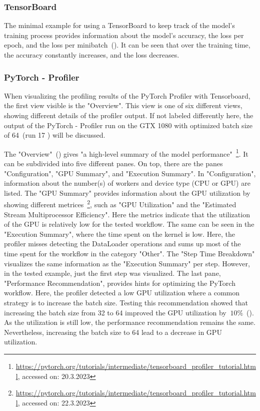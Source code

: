 \documentclass[12pt, a4paper, hidelinks]{article}
\begin{document}
\subsubsection{TensorBoard}
\label{sec:r-tensorboard}

The minimal example for using a TensorBoard to keep track of the model's training process provides information about the model's accuracy, the loss per epoch, and the loss per minibatch~(). It can be seen that over the training time, the accuracy constantly increases, and the loss decreases.

\subsubsection{PyTorch - Profiler}
\label{sec:r-pytorch-profiler}

When visualizing the profiling results of the PyTorch Profiler with Tensorboard, the first view visible is the "Overview". This view is one of six different views, showing different details of the profiler output. If not labeled differently here, the output of the PyTorch - Profiler run on the GTX 1080 with optimized batch size of 64~(run 17 ) will be discussed.

The "Overview"~() gives "a high-level summary of the model performance"~\footnote{\url{https://pytorch.org/tutorials/intermediate/tensorboard_profiler_tutorial.html}, accessed on: 20.3.2023}. It can be subdivided into five different panes. On top, there are the panes "Configuration", "GPU Summary", and "Execution Summary". In "Configuration", information about the number(s) of workers and device type (\ac{CPU} or \ac{GPU}) are listed. The "GPU Summary" provides information about the GPU utilization by showing different metrices~\footnote{\url{https://pytorch.org/tutorials/intermediate/tensorboard_profiler_tutorial.html}, accessed on: 22.3.2023}, such as "GPU Utilization" and the "Estimated Stream Multiprocessor Efficiency". Here the metrics indicate that the utilization of the GPU is relatively low for the tested workflow. The same can be seen in the "Execution Summary", where the time spent on the kernel is low. Here, the profiler misses detecting the DataLoader operations and sums up most of the time spent for the workflow in the category "Other". The "Step Time Breakdown" visualizes the same information as the "Execution Summary" per step. However, in the tested example, just the first step was visualized. The last pane, "Performance Recommendation", provides hints for optimizing the PyTorch workflow. Here, the profiler detected a low \ac{GPU} utilization where a common strategy is to increase the batch size. Testing this recommendation showed that increasing the batch size from 32 to 64 improved the GPU utilization by $~10\%$~(). As the utilization is still low, the performance recommendation remains the same. Nevertheless, increasing the batch size to 64 lead to a decrease in GPU utilization.
\end{document}
